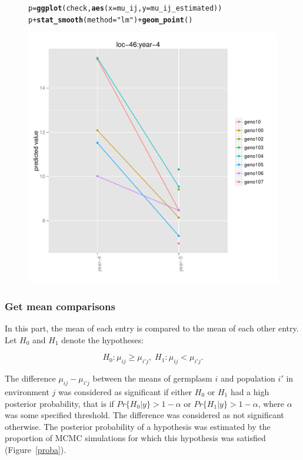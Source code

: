 \documentclass{article}\usepackage[]{graphicx}\usepackage[]{color}
\makeatletter
\newcommand{\hlstr}[1]{\textcolor[rgb]{0.192,0.494,0.8}{#1}}%
\newcommand{\hlopt}[1]{\textcolor[rgb]{0,0,0}{#1}}%
\newcommand{\hlstd}[1]{\textcolor[rgb]{0.345,0.345,0.345}{#1}}%
\newcommand{\hlkwb}[1]{\textcolor[rgb]{0.69,0.353,0.396}{#1}}%
\newcommand{\hlkwc}[1]{\textcolor[rgb]{0.333,0.667,0.333}{#1}}%
\newcommand{\hlkwd}[1]{\textcolor[rgb]{0.737,0.353,0.396}{\textbf{#1}}}%
\newenvironment{kframe}{%
 \def\at@end@of@kframe{}%
 \ifinner\ifhmode%
  \def\at@end@of@kframe{\end{minipage}}%
  \begin{minipage}{\columnwidth}%
 \fi\fi%
 \def\FrameCommand##1{\hskip\@totalleftmargin \hskip-\fboxsep
 \colorbox{shadecolor}{##1}\hskip-\fboxsep
     \hskip-\linewidth \hskip-\@totalleftmargin \hskip\columnwidth}%
 \MakeFramed {\advance\hsize-\width
   \@totalleftmargin\z@ \linewidth\hsize
   \@setminipage}}%
 {\par\unskip\endMakeFramed%
 \at@end@of@kframe}
\newenvironment{knitrout}{}{} %
\makeatother
\begin{document}
\begin{figure}[H]
\begin{knitrout}
\color{fgcolor}\begin{kframe}
\begin{alltt}
\hlstd{p} \hlkwb{=} \hlkwd{ggplot}\hlstd{(check,} \hlkwd{aes}\hlstd{(}\hlkwc{x} \hlstd{= mu_ij,} \hlkwc{y} \hlstd{= mu_ij_estimated))}
\hlstd{p} \hlopt{+} \hlkwd{stat_smooth}\hlstd{(}\hlkwc{method} \hlstd{=} \hlstr{"lm"}\hlstd{)} \hlopt{+} \hlkwd{geom_point}\hlstd{()}
\end{alltt}
\end{kframe}

{\centering \includegraphics[width=.6\textwidth]{figures/PPBstats_unnamed-chunk-50-1} 

}



\end{knitrout}
\end{figure}


\subsubsection{Get mean comparisons}
\label{mean_comp}
In this part, the mean of each entry is compared to the mean of each other entry.
Let $H_{0}$ and $H_{1}$ denote the hypotheses:

\begin{displaymath}
  H_{0} : \mu_{ij} \ge \mu_{i'j} , \; H_{1} : \mu_{ij} < \mu_{i'j}.
\end{displaymath}

The difference $\mu_{ij}-\mu_{i'j}$ between the means of germplasm $i$ and population $i'$ in environment $j$ was considered as significant if either $H_{0}$ or $H_{1}$ had a high posterior probability, that is if $Pr\{H_{0}|y\} > 1 - \alpha$ or $Pr\{H_{1}|y\}> 1 - \alpha$, where
$\alpha$ was some specified threshold.
The difference was considered as not significant otherwise.
The posterior probability of a hypothesis was estimated by the proportion of MCMC simulations for
which this hypothesis was satisfied (Figure~\ref{proba}).
\end{document}
